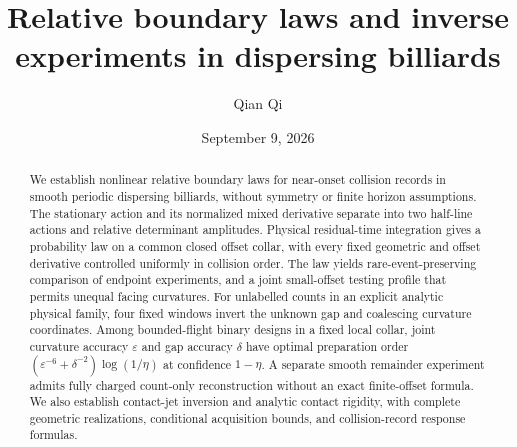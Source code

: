 
\title[Relative boundary laws and inverse experiments]{Relative boundary laws and inverse experiments
in dispersing billiards}
\author{Qian Qi}
\date{September 9, 2026}

\begin{abstract}
We establish nonlinear relative boundary laws for near-onset collision
records in smooth periodic dispersing billiards, without symmetry or
finite horizon assumptions. The stationary action and its normalized
mixed derivative separate into two half-line actions and relative
determinant amplitudes. Physical residual-time integration gives a
probability law on a common closed offset collar, with every fixed
geometric and offset derivative controlled uniformly in collision order.
The law yields rare-event-preserving comparison of endpoint experiments,
and a joint small-offset testing profile that permits unequal facing
curvatures. For unlabelled counts in an explicit analytic physical
family, four fixed windows invert the unknown gap and coalescing
curvature coordinates. Among bounded-flight binary designs in a fixed
local collar, joint curvature accuracy $\varepsilon$ and gap accuracy
$\delta$ have optimal preparation order
$(\varepsilon^{-6}+\delta^{-2})\log(1/\eta)$ at confidence $1-\eta$.
A separate smooth remainder experiment admits fully charged
count-only reconstruction without an exact finite-offset formula.
We also establish contact-jet inversion and analytic contact rigidity,
with complete geometric realizations, conditional acquisition bounds,
and collision-record response formulas.
\end{abstract}
\maketitle

















